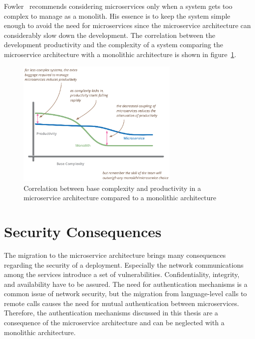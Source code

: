 Fowler~\cite{fowlerpremium} recommends considering microservices only when a system gets too complex to manage as a monolith.
His essence is to keep the system simple enough to avoid the need for microservices since the microservice architecture can considerably slow down the development.
The correlation between the development productivity and the complexity of a system comparing the microservice architecture with a monolithic architecture is shown in figure~\ref{fig:fowler_productivity}.

\begin{figure}[H]
    \centering
    \includegraphics[width=0.7\textwidth]{./images/microservice_architecture/fowler-productivity-complexity.png}
    \caption{Correlation between base complexity and productivity in a microservice architecture compared to a monolithic architecture~\cite{fowlerpremium}}
    \label{fig:fowler_productivity}
\end{figure}

\section{Security Consequences}
The migration to the microservice architecture brings many consequences regarding the security of a deployment.
Especially the network communications among the services introduce a set of vulnerabilities.
Confidentiality, integrity, and availability have to be assured.
The need for authentication mechanisms is a common issue of network security, but the migration from language-level calls to remote calls causes the need for mutual authentication between microservices.
Therefore, the authentication mechanisms discussed in this thesis are a consequence of the microservice architecture and can be neglected with a monolithic architecture.

